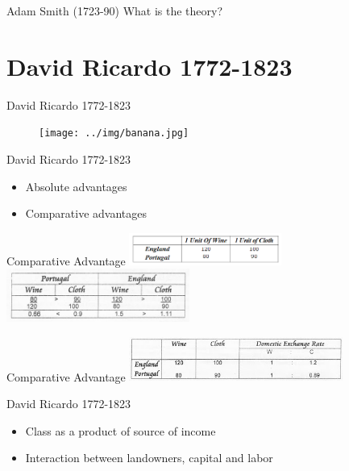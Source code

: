 \documentclass{beamer}
\begin{document}
\begin{frame}{Adam Smith (1723-90)}
What is the theory?
\end{frame}

\section{David Ricardo 1772-1823}
\begin{frame}{David Ricardo 1772-1823}
      \begin{figure}
        \centering
        \texttt{[image: ../img/banana.jpg]}
    \end{figure}  
\end{frame}{}

\begin{frame}{David Ricardo 1772-1823}
    \begin{itemize}[<+- | alert@+>]
    \item Absolute advantages
    \item Comparative advantages
    \end{itemize}
\end{frame}{}

\begin{frame}{Comparative Advantage}
    \includegraphics[width=5cm]{../img/David-Ricardo-England-Portugal-Wine-Cloth-Principle-of-Comparative-Advantage.png}
    \includegraphics[width=6cm]{../img/Cost-Ratios-of-Producing-Wine-Cloth-Portugal-England.jpg}
\end{frame}{}

\begin{frame}{Comparative Advantage}
    \includegraphics[width=7cm]{../img/Comparative-Cost-Benefits-Both-Participants.jpg}
\end{frame}{}

\begin{frame}{David Ricardo 1772-1823}
    \begin{itemize}[<+- | alert@+>]
    \item Class as a product of source of income
    \item Interaction between landowners, capital and labor
    \end{itemize}
\end{frame}{}
\end{document}
